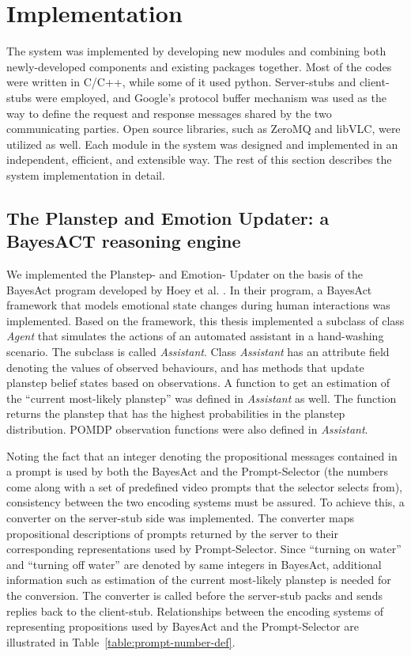\chapter{Implementation}
\label{chap:impl}

The system was implemented by developing new modules and combining both newly-developed components and existing packages together. Most of the codes were written in C/C++, while some of it used python. Server-stubs and client-stubs were employed, and Google's protocol buffer mechanism was used as the way to define the request and response messages shared by the two communicating parties. Open source libraries, such as ZeroMQ and libVLC, were utilized as well. Each module in the system was designed and implemented in an independent, efficient, and extensible way. The rest of this section describes the system implementation in detail.

\section{The Planstep and Emotion Updater: a BayesACT reasoning engine}

We implemented the Planstep- and Emotion- Updater on the basis of the BayesAct program developed by Hoey et al. \cite{hoey2013bayesian}. In their program, a BayesAct framework that models emotional state changes during human interactions was implemented. Based on the framework, this thesis implemented a subclass of class \textit{Agent} that simulates the actions of an automated assistant in a hand-washing scenario. The subclass is called \textit{Assistant}. Class \textit{Assistant} has an attribute field denoting the values of observed behaviours, and has methods that update planstep belief states based on observations. A function to get an estimation of the ``current most-likely planstep'' was defined in \textit{Assistant} as well. The function returns the planstep that has the highest probabilities in the planstep distribution. POMDP observation functions were also defined in \textit{Assistant}. 

Noting the fact that an integer denoting the propositional messages contained in a prompt is used by both the BayesAct and the Prompt-Selector (the numbers come along with a set of predefined video prompts that the selector selects from), consistency between the two encoding systems must be assured. To achieve this, a converter on the server-stub side was implemented. The converter maps propositional descriptions of prompts returned by the server to their corresponding representations used by Prompt-Selector. Since ``turning on water'' and ``turning off water'' are denoted by same integers in BayesAct, additional information such as estimation of the current most-likely planstep is needed for the conversion. The converter is called before the server-stub packs and sends replies back to the client-stub. Relationships between the encoding systems of representing propositions used by BayesAct and the Prompt-Selector are illustrated in Table~\ref{table:prompt-number-def}.

